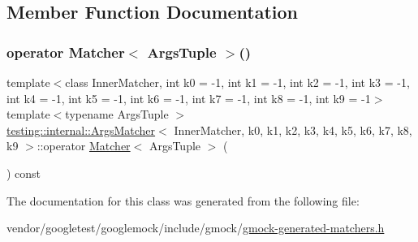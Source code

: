 \subsection{Member Function Documentation}
\mbox{\label{classtesting_1_1internal_1_1_args_matcher_ad55698b0de384a9d8875cef5b172cb4a}} 
\subsubsection{\texorpdfstring{operator Matcher$<$ Args\+Tuple $>$()}{operator Matcher< ArgsTuple >()}}
{\footnotesize\ttfamily template$<$class Inner\+Matcher, int k0 = -\/1, int k1 = -\/1, int k2 = -\/1, int k3 = -\/1, int k4 = -\/1, int k5 = -\/1, int k6 = -\/1, int k7 = -\/1, int k8 = -\/1, int k9 = -\/1$>$ \\
template$<$typename Args\+Tuple $>$ \\
\hyperlink{classtesting_1_1internal_1_1_args_matcher}{testing\+::internal\+::\+Args\+Matcher}$<$ Inner\+Matcher, k0, k1, k2, k3, k4, k5, k6, k7, k8, k9 $>$\+::operator \hyperlink{classtesting_1_1_matcher}{Matcher}$<$ Args\+Tuple $>$ (\begin{DoxyParamCaption}{ }\end{DoxyParamCaption}) const\hspace{0.3cm}{\ttfamily [inline]}}



The documentation for this class was generated from the following file\+:\begin{DoxyCompactItemize}
\item 
vendor/googletest/googlemock/include/gmock/\hyperlink{gmock-generated-matchers_8h}{gmock-\/generated-\/matchers.\+h}\end{DoxyCompactItemize}
